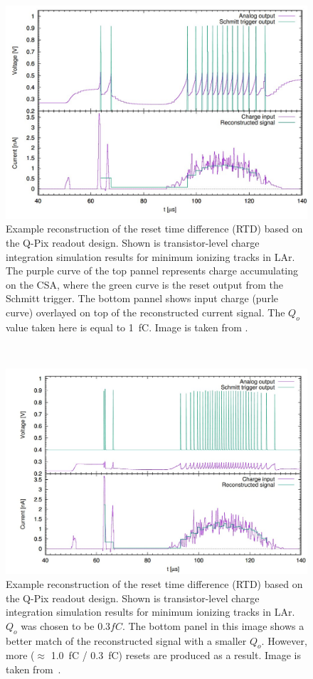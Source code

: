 \begin{figure}[]
\centering
\includegraphics[width=\textwidth]{images/qpix_rtd_reconstruction_example.jpg}
\caption{Example reconstruction of the reset time difference (RTD) based on the Q-Pix readout design. 
Shown is transistor-level charge integration simulation results for minimum ionizing tracks in LAr.
The purple curve of the top pannel represents charge accumulating on the CSA, where the green curve is the reset output from the Schmitt trigger.
The bottom pannel shows input charge (purle curve) overlayed on top of the reconstructed current signal.
The $Q_{o}$ value taken here is equal to 1~\unit{fC}.
Image is taken from \citep{qpix:nygren:mei}.}
\end{figure}~\label{fig:qpixRecon1}

\begin{figure}[]
\centering
\includegraphics[width=\textwidth]{images/qpix_rtd_reconstruction_example_03fc.jpg}
\caption{Example reconstruction of the reset time difference (RTD) based on the Q-Pix readout design.
Shown is transistor-level charge integration simulation results for minimum ionizing tracks in LAr.
$Q_{o}$ was chosen to be $0.3 fC$.
The bottom panel in this image shows a better match of the reconstructed signal with a smaller $Q_{o}$. 
However, more ($\approx$ 1.0~\unit{fC} / 0.3~\unit{fC}) resets are produced as a result. 
Image is taken from~\citep{qpix:nygren:mei}.}
\end{figure}~\label{fig:qpixRecon2}

